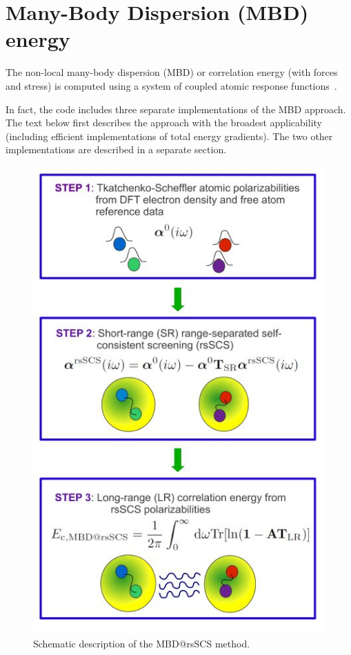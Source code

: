 \section{Many-Body Dispersion (MBD) energy}

The non-local many-body dispersion (MBD) or correlation energy 
(with forces and stress) is computed using a system of coupled atomic response
functions~\cite{MBD,QHORPA}.

In fact, the code includes three separate implementations of the MBD
approach. The text below first describes the approach with the
broadest applicability (including efficient implementations of total
energy gradients). The two other implementations are described in a
separate section.
 
\begin{figure}[h]
\begin{center}
\includegraphics[scale=0.6,trim=0cm 0cm 0cm 0cm]{MBD.jpg}
\end{center}
\caption{Schematic description of the MBD@rsSCS method.} 
\label{mbdmethodfigure}
\end{figure}
